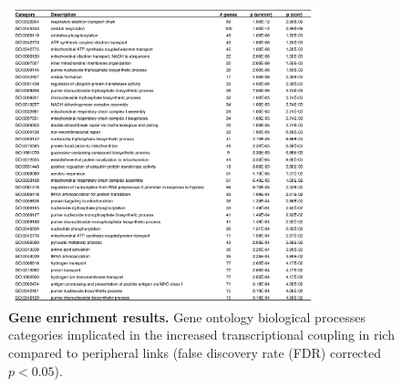 \begin{figure}[h!]
\begin{center}
\includegraphics[width=0.8\textwidth]{Chapter5/SFigure14.pdf}%
\end{center}
\caption{\textbf{Gene enrichment results.} 
Gene ontology biological processes categories implicated in the increased transcriptional coupling in rich compared to peripheral links (false discovery rate (FDR) corrected $p<0.05$). }
\label{fig:Ch5SFig14}
\end{figure}

